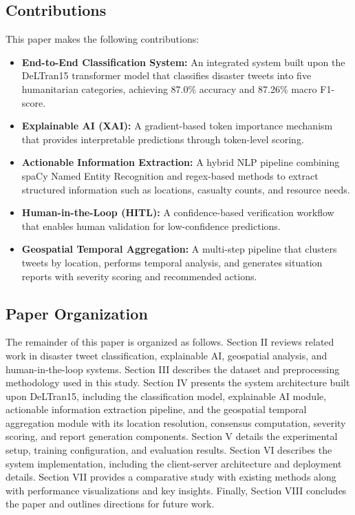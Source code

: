\documentclass[pdflatex,sn-mathphys-num]{sn-jnl}%
\theoremstyle{thmstyleone}%
\theoremstyle{thmstyletwo}%
\theoremstyle{thmstylethree}%
\begin{document}
\subsection{Contributions}

This paper makes the following contributions:

\begin{itemize}
    \item \textbf{End-to-End Classification System:} An integrated system built upon the DeLTran15 \cite{ref16} transformer model that classifies disaster tweets into five humanitarian categories, achieving 87.0\% accuracy and 87.26\% macro F1-score.
    
    \item \textbf{Explainable AI (XAI):} A gradient-based token importance mechanism that provides interpretable predictions through token-level scoring.
    
    \item \textbf{Actionable Information Extraction:} A hybrid NLP pipeline combining spaCy Named Entity Recognition and regex-based methods to extract structured information such as locations, casualty counts, and resource needs.
    
    \item \textbf{Human-in-the-Loop (HITL):} A confidence-based verification workflow that enables human validation for low-confidence predictions.
    
    \item \textbf{Geospatial Temporal Aggregation:} A multi-step pipeline that clusters tweets by location, performs temporal analysis, and generates situation reports with severity scoring and recommended actions.
\end{itemize}
\subsection{Paper Organization}

The remainder of this paper is organized as follows. Section II reviews related work in disaster tweet classification, explainable AI, geospatial analysis, and human-in-the-loop systems. Section III describes the dataset and preprocessing methodology used in this study. Section IV presents the system architecture built upon DeLTran15, including the classification model, explainable AI module, actionable information extraction pipeline, and the geospatial temporal aggregation module with its location resolution, consensus computation, severity scoring, and report generation components. Section V details the experimental setup, training configuration, and evaluation results. Section VI describes the system implementation, including the client-server architecture and deployment details. Section VII provides a comparative study with existing methods along with performance visualizations and key insights. Finally, Section VIII concludes the paper and outlines directions for future work.
\end{document}
